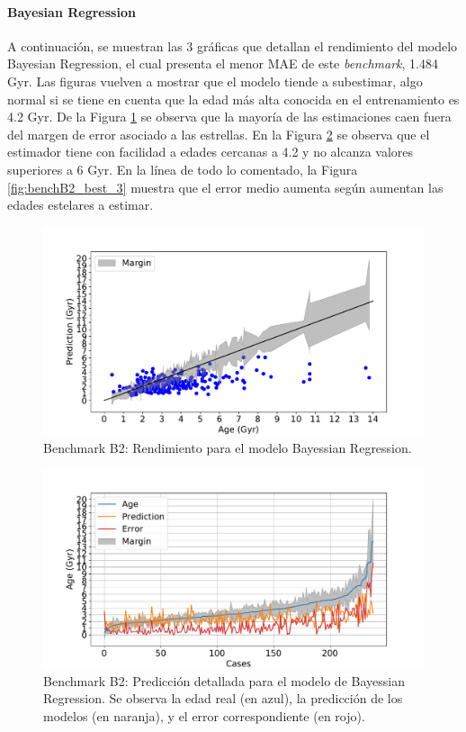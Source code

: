 \paragraph{Bayesian Regression} 
A continuación, se muestran las 3 gráficas que detallan el rendimiento del modelo Bayesian Regression, el cual presenta el menor MAE de este \emph{benchmark}, 1.484 Gyr. Las figuras vuelven a mostrar que el modelo tiende a subestimar, algo normal si se tiene en cuenta que la edad más alta conocida en el entrenamiento es 4.2 Gyr. De la Figura \ref{fig:benchB2_best_1} se observa que la mayoría de las estimaciones caen fuera del margen de error asociado a las estrellas. En la Figura \ref{fig:benchB2_best_2} se observa que el estimador tiene con facilidad a edades cercanas a 4.2 y no alcanza valores superiores a 6 Gyr. En la línea de todo lo comentado, la Figura \ref{fig:benchB2_best_3} muestra que el error medio aumenta según aumentan las edades estelares a estimar. %

\begin{figure}[H]
\begin{center}
 \includegraphics[width=0.8\linewidth]{Figuras/Experimentos/B_B2_bayes_1.pdf}
\end{center}
\caption{Benchmark B2: Rendimiento para el modelo Bayessian Regression.}
 \label{fig:benchB2_best_1}
\end{figure}

\begin{figure}[H]
\begin{center}
 \includegraphics[width=0.8\linewidth]{Figuras/Experimentos/B_B2_bayes_2.pdf}
\end{center}
\caption{Benchmark B2: Predicción detallada para el modelo de Bayessian Regression. Se observa la edad real (en azul), la predicción de los modelos (en naranja), y el error correspondiente (en rojo).}
 \label{fig:benchB2_best_2}
\end{figure}

